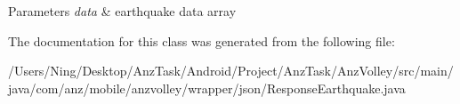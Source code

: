\begin{DoxyParams}{Parameters}
{\em data} & earthquake data array \\
\hline
\end{DoxyParams}


The documentation for this class was generated from the following file\+:\begin{DoxyCompactItemize}
\item 
/\+Users/\+Ning/\+Desktop/\+Anz\+Task/\+Android/\+Project/\+Anz\+Task/\+Anz\+Volley/src/main/java/com/anz/mobile/anzvolley/wrapper/json/Response\+Earthquake.\+java\end{DoxyCompactItemize}
